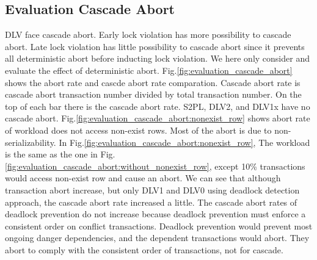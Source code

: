 \documentclass[conference]{IEEEtran}
\begin{document}
\subsection{Evaluation Cascade Abort}
DLV face cascade abort. Early lock violation has more possibility to cascade abort.
Late lock violation has little possibility to cascade abort since it prevents all deterministic abort before inducting lock violation.
We here only consider and evaluate the effect of deterministic abort.
Fig.\ref{fig:evaluation_cascade_abort} shows the abort rate and cascde abort rate comparation.
Cascade abort rate is cascade abort transaction number divided by total transaction number.
On the top of each bar there is the cascade abort rate.
S2PL, DLV2, and DLV1x have no cascade abort.
Fig.\ref{fig:evaluation_cascade_abort:nonexist_row}
shows abort rate of workload does not access non-exist rows.
Most of the abort is due to non-serializability.
In Fig.\ref{fig:evaluation_cascade_abort:nonexist_row},
The workload is the same as the one in Fig.\ref{fig:evaluation_cascade_abort:without_nonexist_row}, except 10\% transactions would access non-exist row and cause an abort.  
We can see that although transaction abort increase, but only DLV1 and DLV0 using deadlock detection approach, the cascade abort rate increased a little.
The cascade abort rates of deadlock prevention do not increase because deadlock prevention must enforce a consistent order on conflict transactions.
Deadlock prevention would prevent most ongoing danger dependencies, and the dependent transactions would abort.
They abort to comply with the consistent order of transactions, not for cascade.
\end{document}
